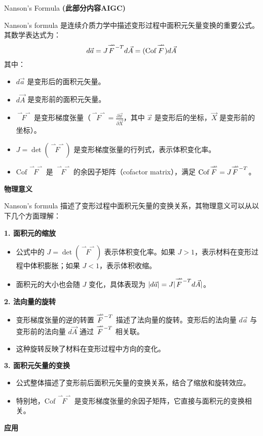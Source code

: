 \documentclass[12pt, a4paper, oneside, UTF8]{ctexbook}  %
\newcommand{\vvec}{\overset{\rightharpoonup\!\!\!\! \rightharpoonup}}
\newcommand{\lmT}{\raisebox{-0.85ex}{$\scriptstyle -T$}} %
\begin{document}
\begin{add}
	Nanson's Formula \textbf{(此部分内容AIGC)}

	Nanson's formula 是连续介质力学中描述变形过程中面积元矢量变换的重要公式。其数学表达式为：
	\[
	d\vec{a} = J \vvec{F}^{\lmT} d\vec{A} = (\text{Cof}\, \vvec{F}) d\vec{A}
	\]
	其中：
	\begin{itemize}
		\item \(d\vec{a}\) 是变形后的面积元矢量。
		\item \(d\vec{A}\) 是变形前的面积元矢量。
		\item \(\vvec{F}\) 是变形梯度张量（\(\vvec{F} = \frac{\partial \vec{x}}{\partial \vec{X}}\)，其中 \(\vec{x}\) 是变形后的坐标，\(\vec{X}\) 是变形前的坐标）。
		\item \(J = \det(\vvec{F})\) 是变形梯度张量的行列式，表示体积变化率。
		\item \(\text{Cof}\, \vvec{F}\) 是 \(\vvec{F}\) 的余因子矩阵（cofactor matrix），满足 \(\text{Cof}\, \vvec{F} = J \vvec{F}^{\lmT}\)。
	\end{itemize}
	\begin{center}
	\textbf{物理意义}
	\end{center}

	Nanson's formula 描述了变形过程中面积元矢量的变换关系，其物理意义可以从以下几个方面理解：
	
	\textbf{1. 面积元的缩放}
	\begin{itemize}
		\item 公式中的 \(J = \det(\vvec{F})\) 表示体积变化率。如果 \(J > 1\)，表示材料在变形过程中体积膨胀；如果 \(J < 1\)，表示体积收缩。
		\item 面积元的大小也会随 \(J\) 变化，具体表现为 \(|d\vec{a}| = J |\vvec{F}^{\lmT} d\vec{A}|\)。
	\end{itemize}
	
	\textbf{2. 法向量的旋转}
	\begin{itemize}
		\item 变形梯度张量的逆的转置 \(\vvec{F}^{\lmT}\) 描述了法向量的旋转。变形后的法向量 \(d\vec{a}\) 与变形前的法向量 \(d\vec{A}\) 通过 \(\vvec{F}^{\lmT}\) 相关联。
		\item 这种旋转反映了材料在变形过程中方向的变化。
	\end{itemize}
	
	\textbf{3. 面积元矢量的变换}
	\begin{itemize}
		\item 公式整体描述了变形前后面积元矢量的变换关系，结合了缩放和旋转效应。
		\item 特别地，\(\text{Cof}\, \vvec{F}\) 是变形梯度张量的余因子矩阵，它直接与面积元的变换相关。
	\end{itemize}
	\begin{center}
	\textbf{应用}
	\end{center}


\end{add}
\end{document}
